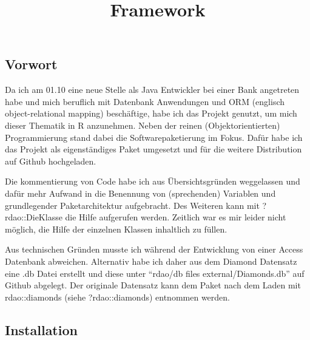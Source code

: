 \documentclass[]{article}
\title{Framework}
\author{}
\date{}
\begin{document}
\maketitle

\hypertarget{vorwort}{%
\subsection{Vorwort}\label{vorwort}}

Da ich am 01.10 eine neue Stelle als Java Entwickler bei einer Bank
angetreten habe und mich beruflich mit Datenbank Anwendungen und ORM
(englisch object-relational mapping) beschäftige, habe ich das Projekt
genutzt, um mich dieser Thematik in R anzunehmen. Neben der reinen
(Objektorientierten) Programmierung stand dabei die Softwarepaketierung
im Fokus. Dafür habe ich das Projekt als eigenständiges Paket umgesetzt
und für die weitere Distribution auf Github hochgeladen.

Die kommentierung von Code habe ich aus Übersichtsgründen weggelassen
und dafür mehr Aufwand in die Benennung von (sprechenden) Variablen und
grundlegender Paketarchitektur aufgebracht. Des Weiteren kann mit
?rdao::DieKlasse die Hilfe aufgerufen werden. Zeitlich war es mir leider
nicht möglich, die Hilfe der einzelnen Klassen inhaltlich zu füllen.

Aus technischen Gründen musste ich während der Entwicklung von einer
Access Datenbank abweichen. Alternativ habe ich daher aus dem Diamond
Datensatz eine .db Datei erstellt und diese unter ``rdao/db files
external/Diamonds.db'' auf Github abgelegt. Der originale Datensatz kann
dem Paket nach dem Laden mit rdao::diamonds (siehe ?rdao::diamonds)
entnommen werden.

\hypertarget{installation}{%
\subsection{Installation}\label{installation}}
\end{document}
